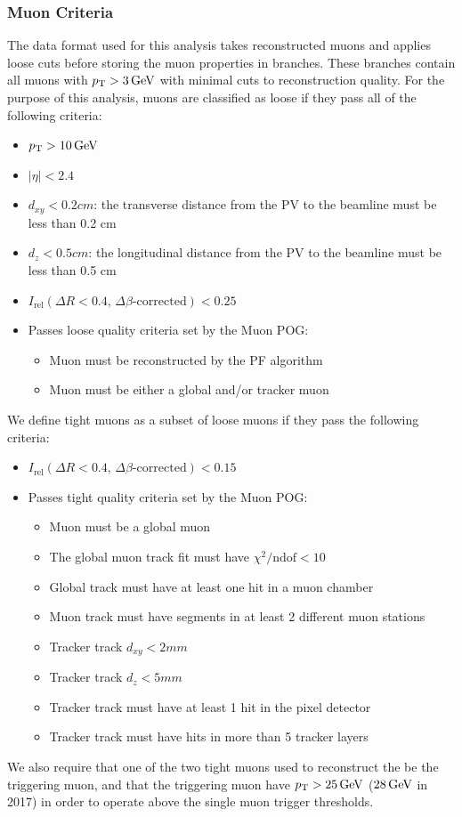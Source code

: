 \subsubsection{Muon Criteria} \label{sec:ana_muons}
The data format used for this analysis takes reconstructed muons and applies loose cuts before storing the muon properties in branches. These branches contain all muons with $p_{\mathrm{T}}>3\,\text{Ge\hspace{-.08em}V}$ with minimal cuts to reconstruction quality. For the purpose of this analysis, muons are classified as loose if they pass all of the following criteria:
\begin{itemize}
	\item $p_{\mathrm{T}}>10\,\text{Ge\hspace{-.08em}V}$
	\item $|\eta|<2.4$
	\item $d_{xy}<0.2\unit{cm}$: the transverse distance from the PV to the beamline must be less than 0.2 cm
	\item $d_{z}<0.5\unit{cm}$: the longitudinal distance from the PV to the beamline must be less than 0.5 cm
	\item $I_\text{rel}(\Delta R<0.4,\,\Delta\beta\text{-corrected})<0.25$
	\item Passes loose quality criteria set by the Muon POG:
	\begin{itemize}
		\item Muon must be reconstructed by the PF algorithm
		\item Muon must be either a global and/or tracker muon
	\end{itemize}
\end{itemize}
We define tight muons as a subset of loose muons if they pass the following criteria:
\begin{itemize}
	\item $I_\text{rel}(\Delta R<0.4,\,\Delta\beta\text{-corrected})<0.15$
	\item Passes tight quality criteria set by the Muon POG:
	\begin{itemize}
		\item Muon must be a global muon
		\item The global muon track fit must have $\chi^2/\text{ndof}<10$
		\item Global track must have at least one hit in a muon chamber %
		\item Muon track must have segments in at least 2 different muon stations %
		\item Tracker track $d_{xy}<2\unit{mm}$
		\item Tracker track $d_{z}<5\unit{mm}$
		\item Tracker track must have at least 1 hit in the pixel detector
		\item Tracker track must have hits in more than 5 tracker layers
	\end{itemize}
\end{itemize}
We also require that one of the two tight muons used to reconstruct the \PZ be the triggering muon, and that the triggering muon have $p_{\mathrm{T}}>25\,\text{Ge\hspace{-.08em}V}$ ($28\,\text{Ge\hspace{-.08em}V}$ in 2017) in order to operate above the single muon trigger \pt thresholds.

